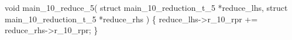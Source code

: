 \begin{DoxyCode}
\textcolor{keywordtype}{void} main\_10\_reduce\_5( \textcolor{keyword}{struct} main\_10\_reduction\_t\_5 *reduce\_lhs, 
                       \textcolor{keyword}{struct} main\_10\_reduction\_t\_5 *reduce\_rhs ) 
\{ 
    reduce\_lhs->r\_10\_rpr += reduce\_rhs->r\_10\_rpr; 
\}
\end{DoxyCode}
 